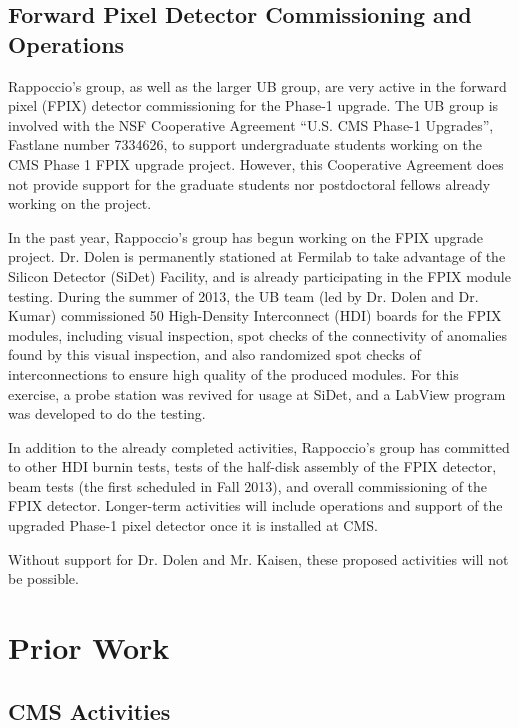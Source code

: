 \documentclass[12pt]{proposalnsf}
\begin{document}
\subsection{Forward Pixel Detector Commissioning and Operations} 

Rappoccio's group, as well as the larger UB group, are very active in
the forward pixel (FPIX) detector
commissioning for the Phase-1 upgrade. The UB group is involved with
the NSF Cooperative Agreement ``U.S. CMS Phase-1 Upgrades'', Fastlane
number 7334626, to support undergraduate students working on the
CMS Phase 1 FPIX upgrade project. 
However, this Cooperative Agreement does not provide support
for the graduate students nor postdoctoral fellows already working on
the project. 

In the past year, Rappoccio's group has begun working on the FPIX
upgrade project. Dr. Dolen is permanently stationed at Fermilab to
take advantage of the Silicon Detector (SiDet) Facility, and is
already participating in the FPIX module testing. During the
summer of 2013, the UB team (led by Dr. Dolen and Dr. Kumar)
commissioned 50 High-Density Interconnect
(HDI) boards for the FPIX modules, including visual inspection, spot
checks of the connectivity of anomalies found by this visual
inspection, and also randomized spot checks of interconnections to
ensure high quality of the produced modules. For this exercise, a
probe station was revived for usage at
SiDet, and a LabView program was developed to do the testing.

In addition to the already completed activities, Rappoccio's group has
committed to other HDI burnin tests, tests of the half-disk assembly
of the FPIX detector, beam tests (the first scheduled in Fall 2013),
and overall commissioning of the FPIX detector. Longer-term activities
will include operations and support of the upgraded Phase-1 pixel
detector once it is installed at CMS. 

Without support for Dr. Dolen and Mr. Kaisen, these proposed
activities will not be possible. 


\section{Prior Work}

\subsection{CMS Activities}
\end{document}
